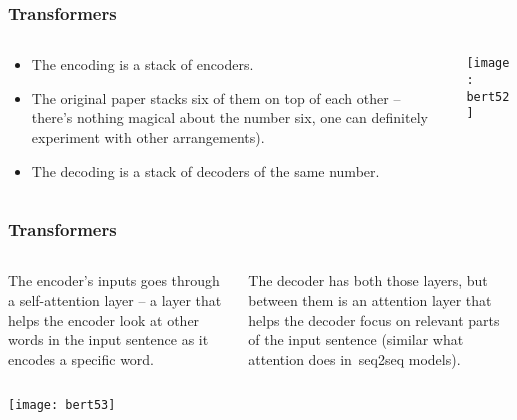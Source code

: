\begin{frame}[fragile]\frametitle{Transformers}
\begin{columns}
    \begin{column}[T]{0.5\linewidth}
      \begin{itemize}
			\item The encoding is a stack of encoders.
			\item The original paper stacks six of them on top of each other – there’s nothing magical about the number six, one can definitely experiment with other arrangements). 
			\item The decoding is a stack of decoders of the same number.
			\end{itemize}
		\end{column}
    \begin{column}[T]{0.5\linewidth}
		
			\begin{center}
			\texttt{[image: bert52]}
			\end{center}

    \end{column}
  \end{columns}
\end{frame}


\begin{frame}[fragile]\frametitle{Transformers}
\begin{columns}
    \begin{column}[T]{0.5\linewidth}
     The encoder’s inputs goes through a self-attention layer – a layer that helps the encoder look at other words in the input sentence as it encodes a specific word.  
		\end{column}
    \begin{column}[T]{0.5\linewidth}
		The decoder has both those layers, but between them is an attention layer that helps the decoder focus on relevant parts of the input sentence (similar what attention does in seq2seq models).
    \end{column}
  \end{columns}
	
			\begin{center}
			\texttt{[image: bert53]}
			\end{center}
			
\end{frame}

